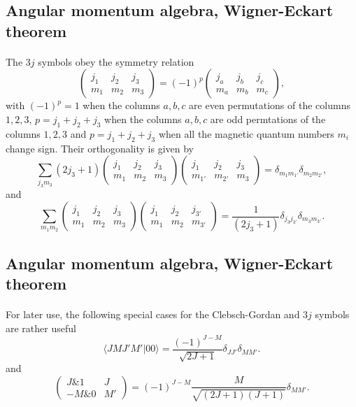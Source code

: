 \documentclass[%
twoside,                 %
final,                   %
10pt]{article}
\begin{document}
\subsection{Angular momentum algebra, Wigner-Eckart theorem}

\paragraph{}
The $3j$ symbols obey the symmetry relation
\[
\left(\begin{array}{ccc}  j_1 & j_2 & j_3 \\ m_1 & m_2 & m_3\end{array}\right)=(-1)^{p}\left(\begin{array}{ccc}  j_a & j_b & j_c \\ m_a & m_b & m_c\end{array}\right),
\]
with $(-1)^p=1$ when the columns $a,b, c$ are even permutations of the columns $1,2,3$, $p=j_1+j_2+j_3$ when the columns $a,b,c$ are odd permtations of the
columns $1,2,3$ and $p=j_1+j_2+j_3$ when all the magnetic quantum numbers $m_i$ change sign. Their orthogonality is given by
\[
\sum_{j_3m_3}(2j_3+1)\left(\begin{array}{ccc}  j_1 & j_2 & j_3 \\ m_1 & m_2 & m_3\end{array}\right)\left(\begin{array}{ccc}  j_1 & j_2 & j_3 \\ m_{1'} & m_{2'} & m_3\end{array}\right)=\delta_{m_1m_{1'}}\delta_{m_2m_{2'}},
\]
and 
\[
\sum_{m_1m_2}\left(\begin{array}{ccc}  j_1 & j_2 & j_3 \\ m_1 & m_2 & m_3\end{array}\right)\left(\begin{array}{ccc}  j_1 & j_2 & j_{3'} \\ m_{1} & m_{2} & m_{3'}\end{array}\right)=\frac{1}{(2j_3+1)}\delta_{j_3j_{3'}}\delta_{m_3m_{3'}}.
\]


\subsection{Angular momentum algebra, Wigner-Eckart theorem}

\paragraph{}
For later use, the following special cases for the Clebsch-Gordan and $3j$ symbols are rather useful
\[
\langle JM J'M' |00\rangle =\frac{(-1)^{J-M}}{\sqrt{2J+1}}\delta_{JJ'}\delta_{MM'}.
\] 
and 
\[
\left(\begin{array}{ccc}  J {\&} 1 & J \\ -M {\&} 0 & M'\end{array}\right)=(-1)^{J-M}\frac{M}{\sqrt{(2J+1)(J+1)}}\delta_{MM'}.
\]
\end{document}
